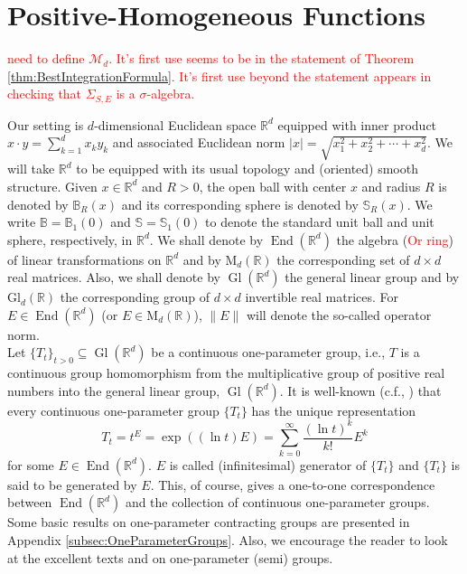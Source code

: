 \documentclass[11pt]{article}
\newcommand\MdR{\mbox{M}_d(\mathbb{R})} %
\newcommand\End{\operatorname{End}} %
\newcommand\GldR{\mbox{Gl}_d(\mathbb{R})}%
\newcommand\Gl{\operatorname{Gl}}                     %
\begin{document}
\section{Positive-Homogeneous Functions}

\textcolor{red}{need to define $\mathcal{M}_d$. It's first use seems to be in the statement of Theorem \ref{thm:BestIntegrationFormula}. It's first use beyond the statement appears in checking that $\Sigma_{S,E}$ is a $\sigma$-algebra.}

Our setting is $d$-dimensional Euclidean space $\mathbb{R}^d$ equipped with inner product $x\cdot y=\sum_{k=1}^dx_ky_k$ and associated Euclidean norm $|x|=\sqrt{x_1^2+x_2^2+\cdots+x_d^2}$. We will take $\mathbb{R}^d$ to be equipped with its usual topology and (oriented) smooth structure. Given $x\in\mathbb{R}^d$ and $R>0$, the open ball with center $x$ and radius $R$ is denoted by $\mathbb{B}_R(x)$ and its corresponding sphere is denoted by $\mathbb{S}_R(x)$. We write $\mathbb{B}=\mathbb{B}_1(0)$ and $\mathbb{S}=\mathbb{S}_1(0)$ to denote the standard unit ball and unit sphere, respectively, in $\mathbb{R}^d$. We shall denote by $\End(\mathbb{R}^d)$ the algebra (\textcolor{red}{Or ring}) of linear transformations on $\mathbb{R}^d$ and by $\MdR$ the corresponding set of $d\times d$ real matrices. Also, we shall denote by $\Gl(\mathbb{R}^d)$ the general linear group and by $\GldR$ the corresponding group of $d\times d$ invertible real matrices. For $E\in \End(\mathbb{R}^d)$ (or $E\in\MdR$), $\|E\|$ will denote the so-called operator norm.\\

\noindent Let $\{T_t\}_{t>0}\subseteq \Gl(\mathbb{R}^d)$ be a continuous one-parameter group, i.e., $T$ is a continuous group homomorphism from the multiplicative group of positive real numbers into the general linear group, $\Gl(\mathbb{R}^d)$. It is well-known (c.f., \cite{Randles2017,Engel2000,Engel2005}) that every continuous one-parameter group $\{T_t\}$ has the unique representation
\begin{equation*}
T_t=t^E=\exp((\ln t) E)=\sum_{k=0}^\infty \frac{(\ln t)^k}{k!}E^k
\end{equation*}
for some $E\in\End(\mathbb{R}^d)$. $E$ is called (infinitesimal) generator of $\{T_t\}$ and $\{T_t\}$ is said to be generated by $E$. This, of course, gives a one-to-one correspondence between $\End(\mathbb{R}^d)$ and the collection of continuous one-parameter groups. Some basic results on one-parameter contracting groups are presented in Appendix \ref{subsec:OneParameterGroups}. Also, we encourage the reader to look at the excellent texts \cite{Engel2005} and \cite{Engel2000} on one-parameter (semi) groups.
\end{document}
